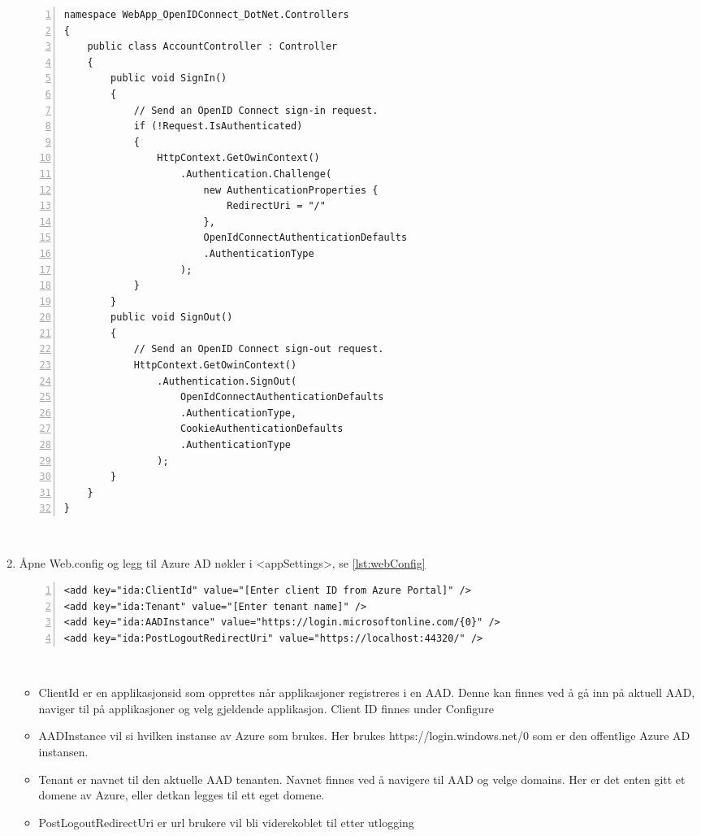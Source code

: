\begin{enumerate}
\begin{lstlisting}[captionpos=b, caption={AccountController.cs},label={lst:accountController},numbers=left]
namespace WebApp_OpenIDConnect_DotNet.Controllers
{
    public class AccountController : Controller
    {
        public void SignIn()
        {
            // Send an OpenID Connect sign-in request.
            if (!Request.IsAuthenticated)
            {
                HttpContext.GetOwinContext()
                    .Authentication.Challenge(
                        new AuthenticationProperties { 
                            RedirectUri = "/" 
                        },
                        OpenIdConnectAuthenticationDefaults
                        .AuthenticationType
                    );
            }
        }
        public void SignOut()
        {
            // Send an OpenID Connect sign-out request.
            HttpContext.GetOwinContext()
                .Authentication.SignOut(
                    OpenIdConnectAuthenticationDefaults
                    .AuthenticationType,
                    CookieAuthenticationDefaults
                    .AuthenticationType
                );
        }
	}
}
\end{lstlisting}
\\
\item Åpne Web.config og legg til Azure AD nøkler i <appSettings>, se \ref{lst:webConfig}
\begin{lstlisting}[captionpos=b, caption={Web.config},label={lst:webConfig},numbers=left]
<add key="ida:ClientId" value="[Enter client ID from Azure Portal]" />
<add key="ida:Tenant" value="[Enter tenant name]" />
<add key="ida:AADInstance" value="https://login.microsoftonline.com/{0}" />
<add key="ida:PostLogoutRedirectUri" value="https://localhost:44320/" />
\end{lstlisting}
\\
    \begin{itemize}
    \item ClientId er en applikasjonsid som opprettes når applikasjoner registreres i en AAD. Denne kan finnes ved å gå inn på aktuell AAD, naviger til på applikasjoner og velg gjeldende applikasjon. Client ID finnes under Configure
    \item AADInstance vil si hvilken instanse av Azure som brukes. Her brukes https://login.windows.net/{0} som er den offentlige Azure AD instansen.
    \item Tenant er navnet til den aktuelle  AAD tenanten. Navnet finnes ved å navigere til AAD og velge domains. Her er det enten gitt et domene av Azure, eller detkan legges til ett eget domene.
    \item PostLogoutRedirectUri er url brukere vil bli viderekoblet til etter utlogging
    \end{itemize}
\end{enumerate}
